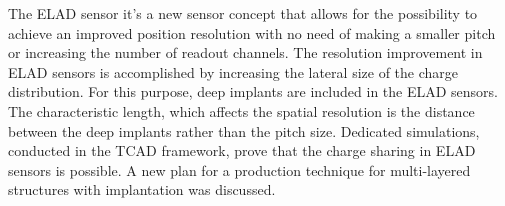 
The ELAD sensor it's a new sensor concept that allows for the possibility to achieve an improved position resolution with no need of making a smaller pitch or increasing the number of readout channels. 
The resolution improvement in ELAD sensors is accomplished by increasing the lateral size of the charge distribution. 
For this purpose, deep implants are included in the ELAD sensors. 
The characteristic length, which affects the spatial resolution is the distance between the deep implants rather than the pitch size. 
Dedicated simulations, conducted in the TCAD framework, prove that the charge sharing in ELAD sensors is possible. 
A new plan for a production technique for multi-layered structures with implantation was discussed. 
